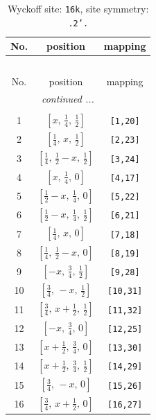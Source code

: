 \documentclass[fleqn,8pt]{jsarticle}
\begin{document}
\renewcommand{\arraystretch}{1.2}
\begin{longtable}{ccc}
\caption{Wyckoff site: {\tt 16k}, site symmetry: {\tt .2'.}}
 \\
 \hline \hline
No. & position & mapping \\ \hline \endfirsthead

\multicolumn{2}{l}{\tablename\ \thetable{}} \\
 \hline \hline
No. & position & mapping \\ \hline \endhead

 \hline \hline
\multicolumn{2}{r}{\footnotesize\it continued ...} \\ \endfoot

 \hline \hline
\multicolumn{2}{r}{} \\ \endlastfoot

1 & $\left[ x,\, \frac{1}{4},\, \frac{1}{2} \right]$ & {\tt [1,20]} \\ \hline
2 & $\left[ \frac{1}{4},\, x,\, \frac{1}{2} \right]$ & {\tt [2,23]} \\ \hline
3 & $\left[ \frac{1}{4},\, \frac{1}{2} - x,\, \frac{1}{2} \right]$ & {\tt [3,24]} \\ \hline
4 & $\left[ x,\, \frac{1}{4},\, 0 \right]$ & {\tt [4,17]} \\ \hline
5 & $\left[ \frac{1}{2} - x,\, \frac{1}{4},\, 0 \right]$ & {\tt [5,22]} \\ \hline
6 & $\left[ \frac{1}{2} - x,\, \frac{1}{4},\, \frac{1}{2} \right]$ & {\tt [6,21]} \\ \hline
7 & $\left[ \frac{1}{4},\, x,\, 0 \right]$ & {\tt [7,18]} \\ \hline
8 & $\left[ \frac{1}{4},\, \frac{1}{2} - x,\, 0 \right]$ & {\tt [8,19]} \\ \hline
9 & $\left[ - x,\, \frac{3}{4},\, \frac{1}{2} \right]$ & {\tt [9,28]} \\ \hline
10 & $\left[ \frac{3}{4},\, - x,\, \frac{1}{2} \right]$ & {\tt [10,31]} \\ \hline
11 & $\left[ \frac{3}{4},\, x + \frac{1}{2},\, \frac{1}{2} \right]$ & {\tt [11,32]} \\ \hline
12 & $\left[ - x,\, \frac{3}{4},\, 0 \right]$ & {\tt [12,25]} \\ \hline
13 & $\left[ x + \frac{1}{2},\, \frac{3}{4},\, 0 \right]$ & {\tt [13,30]} \\ \hline
14 & $\left[ x + \frac{1}{2},\, \frac{3}{4},\, \frac{1}{2} \right]$ & {\tt [14,29]} \\ \hline
15 & $\left[ \frac{3}{4},\, - x,\, 0 \right]$ & {\tt [15,26]} \\ \hline
16 & $\left[ \frac{3}{4},\, x + \frac{1}{2},\, 0 \right]$ & {\tt [16,27]} \\
\end{longtable}
\end{document}
